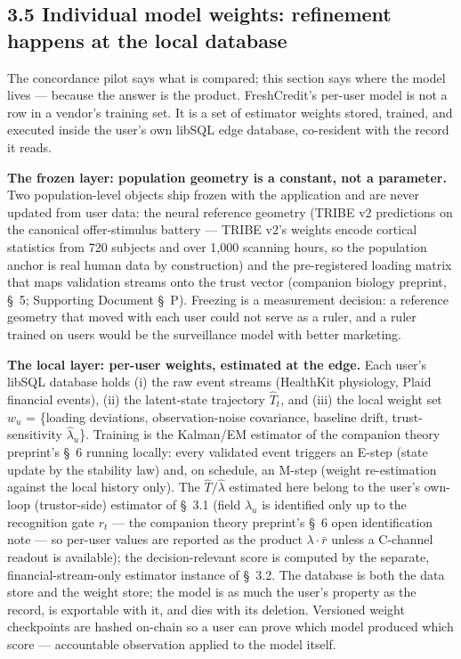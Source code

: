 \documentclass[11pt,twocolumn]{article}
\begin{document}
\subsection*{3.5 Individual model weights: refinement happens at the local database}

The concordance pilot says what is compared; this section says where the model lives --- because the answer is the product. FreshCredit's per-user model is not a row in a vendor's training set. It is a set of estimator weights stored, trained, and executed inside the user's own libSQL edge database, co-resident with the record it reads.

\textbf{The frozen layer: population geometry is a constant, not a parameter.} Two population-level objects ship frozen with the application and are never updated from user data: the neural reference geometry (TRIBE v2 predictions on the canonical offer-stimulus battery --- TRIBE v2's weights encode cortical statistics from 720 subjects and over 1,000 scanning hours, so the population anchor is real human data by construction) and the pre-registered loading matrix that maps validation streams onto the trust vector (companion biology preprint, \S~5; Supporting Document \S~P). Freezing is a measurement decision: a reference geometry that moved with each user could not serve as a ruler, and a ruler trained on users would be the surveillance model with better marketing.

\textbf{The local layer: per-user weights, estimated at the edge.} Each user's libSQL database holds (i) the raw event streams (HealthKit physiology, Plaid financial events), (ii) the latent-state trajectory $\hat{T}_t$, and (iii) the local weight set $w_u$ = \{loading deviations, observation-noise covariance, baseline drift, trust-sensitivity $\hat{\lambda}_u$\}. Training is the Kalman/EM estimator of the companion theory preprint's \S~6 running locally: every validated event triggers an E-step (state update by the stability law) and, on schedule, an M-step (weight re-estimation against the local history only). The $\hat{T}/\hat{\lambda}$ estimated here belong to the user's own-loop (trustor-side) estimator of \S~3.1 (field $\hat{\lambda}_u$ is identified only up to the recognition gate $r_t$ --- the companion theory preprint's \S~6 open identification note --- so per-user values are reported as the product $\lambda\cdot\bar{r}$ unless a C-channel readout is available); the decision-relevant score is computed by the separate, financial-stream-only estimator instance of \S~3.2. The database is both the data store and the weight store; the model is as much the user's property as the record, is exportable with it, and dies with its deletion. Versioned weight checkpoints are hashed on-chain so a user can prove which model produced which score --- accountable observation applied to the model itself.
\end{document}
